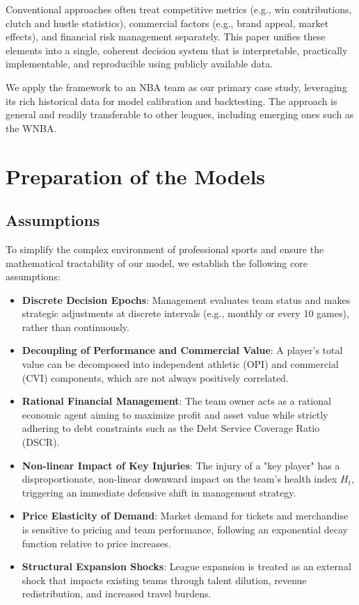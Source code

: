 \documentclass{mcmthesis}
\begin{document}
Conventional approaches often treat competitive metrics (e.g., win contributions, clutch and hustle statistics), commercial factors (e.g., brand appeal, market effects), and financial risk management separately. This paper unifies these elements into a single, coherent decision system that is interpretable, practically implementable, and reproducible using publicly available data.

We apply the framework to an NBA team as our primary case study, leveraging its rich historical data for model calibration and backtesting. The approach is general and readily transferable to other leagues, including emerging ones such as the WNBA.

\section{Preparation of the Models}
\subsection{Assumptions}
To simplify the complex environment of professional sports and ensure the mathematical tractability of our model, we establish the following core assumptions:

\begin{itemize}
    \item \textbf{Discrete Decision Epochs}: Management evaluates team status and makes strategic adjustments at discrete intervals (e.g., monthly or every 10 games), rather than continuously. 
    \item \textbf{Decoupling of Performance and Commercial Value}: A player's total value can be decomposed into independent athletic (OPI) and commercial (CVI) components, which are not always positively correlated.
    \item \textbf{Rational Financial Management}: The team owner acts as a rational economic agent aiming to maximize profit and asset value while strictly adhering to debt constraints such as the Debt Service Coverage Ratio (DSCR).
    \item \textbf{Non-linear Impact of Key Injuries}: The injury of a "key player" has a disproportionate, non-linear downward impact on the team's health index $H_t$, triggering an immediate defensive shift in management strategy.
    \item \textbf{Price Elasticity of Demand}: Market demand for tickets and merchandise is sensitive to pricing and team performance, following an exponential decay function relative to price increases.
    \item \textbf{Structural Expansion Shocks}: League expansion is treated as an external shock that impacts existing teams through talent dilution, revenue redistribution, and increased travel burdens.
\end{itemize}
\end{document}
